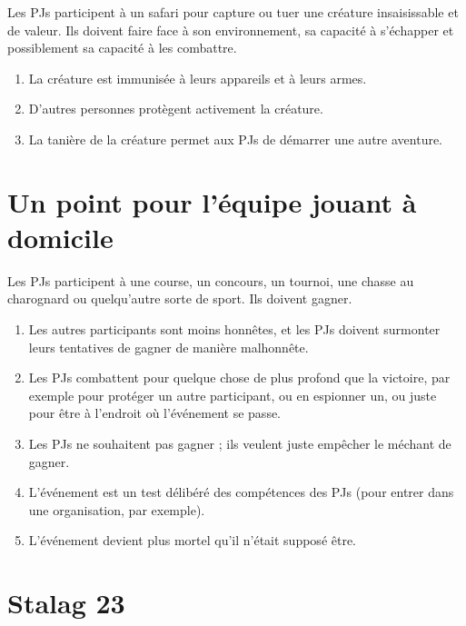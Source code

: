 \begin{multicols}{2}

Les PJs participent à un safari pour capture ou tuer une créature insaisissable et de valeur. Ils doivent faire face à son environnement, sa capacité à s'échapper et possiblement sa capacité à les combattre.

\themes
\begin{enumerate}
\item La créature est immunisée à leurs appareils et à leurs armes.
\item D'autres personnes protègent activement la créature.
\item La tanière de la créature permet aux PJs de démarrer une autre aventure.
\end{enumerate}

\section{Un point pour l'équipe jouant à domicile}
\hypertarget{domicile}{}


Les PJs participent à une course, un concours, un tournoi, une chasse au charognard ou quelqu'autre sorte de sport. Ils doivent gagner.

\themes
\begin{enumerate}
\item Les autres participants sont moins honnêtes, et les PJs doivent surmonter leurs tentatives de gagner de manière malhonnête.
\item Les PJs combattent pour quelque chose de plus profond que la victoire, par exemple pour protéger un autre participant, ou en espionner un, ou juste pour être à l'endroit où l'événement se passe.
\item Les PJs ne souhaitent pas gagner ; ils veulent juste empêcher le méchant de gagner.
\item L'événement est un test délibéré des compétences des PJs (pour entrer dans une organisation, par exemple).
\item L'événement devient plus mortel qu'il n'était supposé être.
\end{enumerate}

\section{Stalag 23}
\hypertarget{stalag}{}



\end{multicols}
